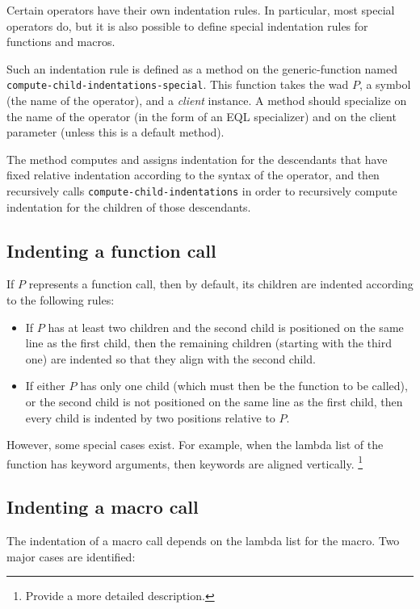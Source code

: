 Certain operators have their own indentation rules.  In particular,
most special operators do, but it is also possible to define special
indentation rules for functions and macros.

Such an indentation rule is defined as a method on the
generic-function named \texttt{compute-child-indentations-special}.
This function takes the wad $P$, a symbol (the name of the
operator), and a \emph{client} instance.  A method should specialize
on the name of the operator (in the form of an EQL specializer) and on
the client parameter (unless this is a default method).

The method computes and assigns indentation for the descendants that
have fixed relative indentation according to the syntax of the
operator, and then recursively calls
\texttt{compute-child-indentations} in order to recursively compute
indentation for the children of those descendants.

\subsection{Indenting a function call}

If $P$ represents a function call, then by default, its children are
indented according to the following rules:

\begin{itemize}
\item If $P$ has at least two children and the second child is
  positioned on the same line as the first child, then the remaining
  children (starting with the third one) are indented so that they
  align with the second child.
\item If either $P$ has only one child (which must then be the
  function to be called), or the second child is not positioned on the
  same line as the first child, then every child is indented by two
  positions relative to $P$.
\end{itemize}

However, some special cases exist.  For example, when the lambda list
of the function has keyword arguments, then keywords are aligned
vertically.%
\footnote{Provide a more detailed description.}

\subsection{Indenting a macro call}

The indentation of a macro call depends on the lambda list for the
macro.  Two major cases are identified:

